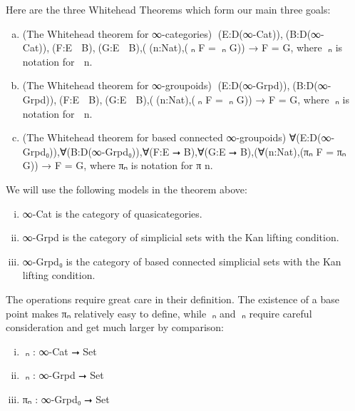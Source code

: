 \documentclass{book}
\theoremstyle{definition}
\begin{document}
Here are the three Whitehead Theorems which form our main three goals:

\begin{enumerate}[(a)]
\item (The Whitehead theorem for ∞-categories) ∀(E:D⃗(∞-Cat)),∀(B:D⃗(∞-Cat)),∀(F:E ⭢ B),∀(G:E ⭢ B),(∀(n:Nat),(π⃗ₙ F = π⃗ₙ G)) → F = G, where π⃗ₙ is notation for π⃗ n.
\item (The Whitehead theorem for ∞-groupoids) ∀(E:D⃡(∞-Grpd)),∀(B:D⃡(∞-Grpd)),∀(F:E ⭢ B),∀(G:E ⭢ B),(∀(n:Nat),(π⃡ₙ F = π⃡ₙ G)) → F = G, where π⃡ₙ is notation for π⃡ n.
\item (The Whitehead theorem for based connected ∞-groupoids) ∀(E:D(∞-Grpd₀)),∀(B:D(∞-Grpd₀)),∀(F:E ⭢ B),∀(G:E ⭢ B),(∀(n:Nat),(πₙ F = πₙ G)) → F = G, where πₙ is notation for π n.
\end{enumerate}

We will use the following models in the theorem above:

\begin{enumerate}[(i)]
\item ∞-Cat is the category of quasicategories.
\item ∞-Grpd is the category of simplicial sets with the Kan lifting condition.
\item ∞-Grpd₀ is the category of based connected simplicial sets with the Kan lifting condition.
\end{enumerate}

The operations require great care in their definition. The existence of a base point makes πₙ relatively easy to define, while π⃗ₙ and π⃡ₙ require careful consideration and get much larger by comparison:

\begin{enumerate}[(i)]
\item π⃗ₙ : ∞-Cat ⭢ Set
\item π⃡ₙ : ∞-Grpd ⭢ Set
\item πₙ : ∞-Grpd₀ ⭢ Set
\end{enumerate}
\end{document}
